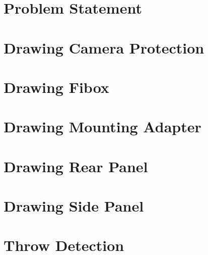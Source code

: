 \begin{appendix} 
  \section{Problem Statement}
  \label{app:problem_statement}
  

  \section{Drawing Camera Protection}
  \label{app:drawings_camera_protection}
  

  \section{Drawing Fibox}
  \label{app:drawings_fibox_bottom}
  

  \section{Drawing Mounting Adapter}
  \label{app:drawings_mounting_adapter}
  

  \section{Drawing Rear Panel}
  \label{app:drawings_rear_panel}
  

  \section{Drawing Side Panel}
  \label{app:drawings_side_panel}
  

  \section{Throw Detection}
  \label{app:throw_detection}
  
\end{appendix}
